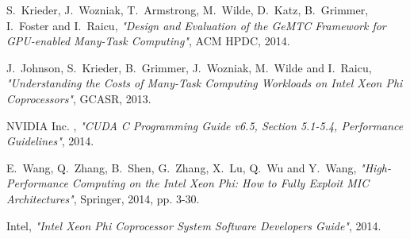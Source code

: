 \documentclass[10pt, conference, compsocconf]{IEEEtran}
\begin{document}

%
%
%
\begin{thebibliography}{1}

S.~Krieder, J.~Wozniak, T.~Armstrong, M.~Wilde, D.~Katz, B.~Grimmer,
I.~Foster and I.~Raicu, \emph{"Design and Evaluation of the GeMTC
Framework for GPU-enabled Many-Task Computing"}, ACM HPDC, 2014.

J.~Johnson, S.~Krieder, B.~Grimmer, J.~Wozniak, M.~Wilde and I.~Raicu,
\emph{"Understanding the Costs of Many-Task Computing Workloads
on Intel Xeon Phi Coprocessors"}, GCASR, 2013.

NVIDIA Inc. , \emph{"CUDA C Programming Guide v6.5, Section 5.1-5.4,
Performance Guidelines"}, 2014.

E.~Wang, Q.~Zhang, B.~Shen, G.~Zhang, X.~Lu, Q.~Wu and Y.~Wang,
\emph{"High-Performance Computing on the Intel Xeon Phi: How to
Fully Exploit MIC Architectures"}, Springer, 2014, pp. 3-30.

Intel,
\emph{"Intel Xeon Phi Coprocessor System Software Developers Guide"},
2014.

\end{thebibliography}




\end{document}
